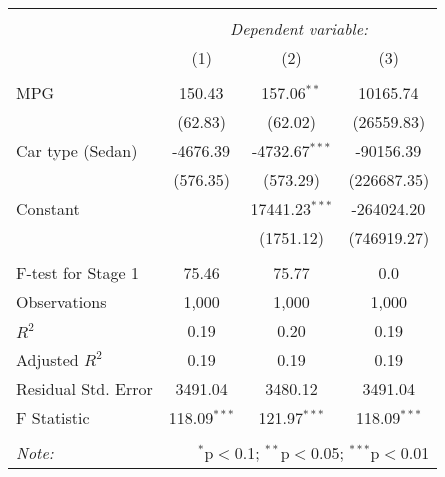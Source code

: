 \begin{tabular}{@{\extracolsep{5pt}}lccc}
\\[-1.8ex]\hline
\hline \\[-1.8ex]
& \multicolumn{3}{c}{\textit{Dependent variable:}} \
\cr \cline{3-4}
\\[-1.8ex] & (1) & (2) & (3) \\
\hline \\[-1.8ex]
 MPG & 150.43$^{}$ & 157.06$^{**}$ & 10165.74$^{}$ \\
  & (62.83) & (62.02) & (26559.83) \\
 Car type (Sedan) & -4676.39$^{}$ & -4732.67$^{***}$ & -90156.39$^{}$ \\
  & (576.35) & (573.29) & (226687.35) \\
 Constant & & 17441.23$^{***}$ & -264024.20$^{}$ \\
  & & (1751.12) & (746919.27) \\
\hline \\[-1.8ex]
 F-test for Stage 1 & 75.46 & 75.77 & 0.0 \\
 Observations & 1,000 & 1,000 & 1,000 \\
 $R^2$ & 0.19 & 0.20 & 0.19 \\
 Adjusted $R^2$ & 0.19 & 0.19 & 0.19 \\
 Residual Std. Error & 3491.04 & 3480.12 & 3491.04  \\
 F Statistic & 118.09$^{***}$  & 121.97$^{***}$  & 118.09$^{***}$  \\
\hline
\hline \\[-1.8ex]
\textit{Note:} & \multicolumn{3}{r}{$^{*}$p$<$0.1; $^{**}$p$<$0.05; $^{***}$p$<$0.01} \\
\end{tabular}